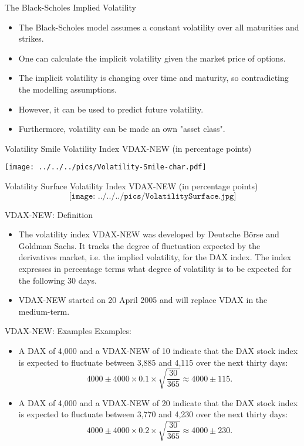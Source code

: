 {The Black-Scholes Implied Volatility}
\begin{itemize}
\item<1-> The Black-Scholes model assumes a constant volatility over all maturities and strikes.
\item<2-> One can calculate the implicit volatility given the market price of options.
\item<3-> The implicit volatility is changing over time and maturity, so contradicting the modelling assumptions.
\item<4-> However, it can be used to predict future volatility.
\item<5-> Furthermore, volatility can be made an own "asset class".
\end{itemize}




{Volatility Smile}
Volatility Index VDAX-NEW (in percentage points)
\begin{center}
\texttt{[image: ../../../pics/Volatility-Smile-char.pdf]}
\end{center}


{Volatility Surface}
Volatility Index VDAX-NEW (in percentage points)
$$\texttt{[image: ../../../pics/VolatilitySurface.jpg]}$$




{VDAX-NEW: Definition}
\begin{itemize}
  \item The volatility index VDAX-NEW was developed by Deutsche B{\"o}rse and Goldman Sachs. It tracks the degree of fluctuation expected by the derivatives market, i.e. the implied volatility, for the DAX index. The index expresses in percentage terms what degree of volatility is to be expected for the following 30 days.
  \item VDAX-NEW started on 20 April 2005 and will replace VDAX in the medium-term.
\end{itemize}




{VDAX-NEW: Examples}
Examples:\\
\vspace{0.3cm}
\begin{itemize}
  \item<1-> A DAX of 4,000 and a VDAX-NEW of 10 indicate that the DAX stock index is expected to fluctuate between 3,885 and 4,115 over the next thirty days:
  $$4000\pm4000\times0.1\times\sqrt{\frac{30}{365}}\approx4000\pm115.$$
  \item<2-> A DAX of 4,000 and a VDAX-NEW of 20 indicate that the DAX stock index is expected to fluctuate between 3,770 and 4,230 over the next thirty days:
    $$4000\pm4000\times0.2\times\sqrt{\frac{30}{365}}\approx4000\pm230.$$
\end{itemize}




